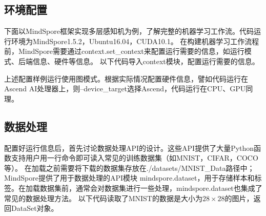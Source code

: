 \documentclass[letterpaper,10pt,english]{sphinxmanual}
\begin{document}
\subsection{环境配置}
\label{\detokenize{chapter_programming_interface/ml_workflow:id2}}
\sphinxAtStartPar
下面以MindSpore框架实现多层感知机为例，了解完整的机器学习工作流。代码运行环境为MindSpore1.5.2，Ubuntu16.04，CUDA10.1。
在构建机器学习工作流程前，MindSpore需要通过context.set\_context来配置运行需要的信息，如运行模式、后端信息、硬件等信息。
以下代码导入context模块，配置运行需要的信息。

\begin{sphinxVerbatim}[commandchars=\\\{\}]
 
 
   
  
   \PYG{p}{[}  \PYG{p}{]}
  \PYG{p}{[}\PYG{p}{]}
 
\end{sphinxVerbatim}

\sphinxAtStartPar
上述配置样例运行使用图模式。根据实际情况配置硬件信息，譬如代码运行在Ascend
AI处理器上，则–device\_target选择Ascend，代码运行在CPU、GPU同理。


\subsection{数据处理}
\label{\detokenize{chapter_programming_interface/ml_workflow:id3}}
\sphinxAtStartPar
配置好运行信息后，首先讨论数据处理API的设计。这些API提供了大量Python函数支持用户用一行命令即可读入常见的训练数据集（如MNIST，CIFAR，COCO等）。
在加载之前需要将下载的数据集存放在./datasets/MNIST\_Data路径中；MindSpore提供了用于数据处理的API模块
mindspore.dataset，用于存储样本和标签。在加载数据集前，通常会对数据集进行一些处理，mindspore.dataset也集成了常见的数据处理方法。
以下代码读取了MNIST的数据是大小为\(28 \times 28\)的图片，返回DataSet对象。
\end{document}
